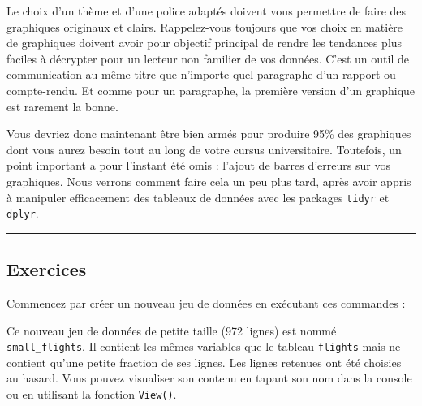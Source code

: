 \documentclass[a4paperpaper,]{article}
\newenvironment{Shaded}{\begin{snugshade}}{\end{snugshade}}
\newcommand{\DecValTok}[1]{\textcolor[rgb]{0.69,0.50,0.00}{#1}}
\newcommand{\KeywordTok}[1]{\textcolor[rgb]{0.12,0.11,0.11}{\textbf{#1}}}
\newcommand{\NormalTok}[1]{\textcolor[rgb]{0.12,0.11,0.11}{#1}}
\newcommand{\OperatorTok}[1]{\textcolor[rgb]{0.12,0.11,0.11}{#1}}
\newcommand{\StringTok}[1]{\textcolor[rgb]{0.75,0.01,0.01}{#1}}
\theoremstyle{definition}
\theoremstyle{definition}
\theoremstyle{definition}
\theoremstyle{remark}
\begin{document}
Le choix d'un thème et d'une police adaptés doivent vous permettre de
faire des graphiques originaux et clairs. Rappelez-vous toujours que vos
choix en matière de graphiques doivent avoir pour objectif principal de
rendre les tendances plus faciles à décrypter pour un lecteur non
familier de vos données. C'est un outil de communication au même titre
que n'importe quel paragraphe d'un rapport ou compte-rendu. Et comme
pour un paragraphe, la première version d'un graphique est rarement la
bonne.

Vous devriez donc maintenant être bien armés pour produire 95\% des
graphiques dont vous aurez besoin tout au long de votre cursus
universitaire. Toutefois, un point important a pour l'instant été omis :
l'ajout de barres d'erreurs sur vos graphiques. Nous verrons comment
faire cela un peu plus tard, après avoir appris à manipuler efficacement
des tableaux de données avec les packages \texttt{tidyr} et
\texttt{dplyr}.

\begin{center}\rule{0.5\linewidth}{\linethickness}\end{center}

\hypertarget{exercices-6}{%
\subsection{Exercices}\label{exercices-6}}

Commencez par créer un nouveau jeu de données en exécutant ces commandes
:

\begin{Shaded}
\end{Shaded}

Ce nouveau jeu de données de petite taille (972 lignes) est nommé
\texttt{small\_flights}. Il contient les mêmes variables que le tableau
\texttt{flights} mais ne contient qu'une petite fraction de ses lignes.
Les lignes retenues ont été choisies au hasard. Vous pouvez visualiser
son contenu en tapant son nom dans la console ou en utilisant la
fonction \texttt{View()}.
\end{document}
